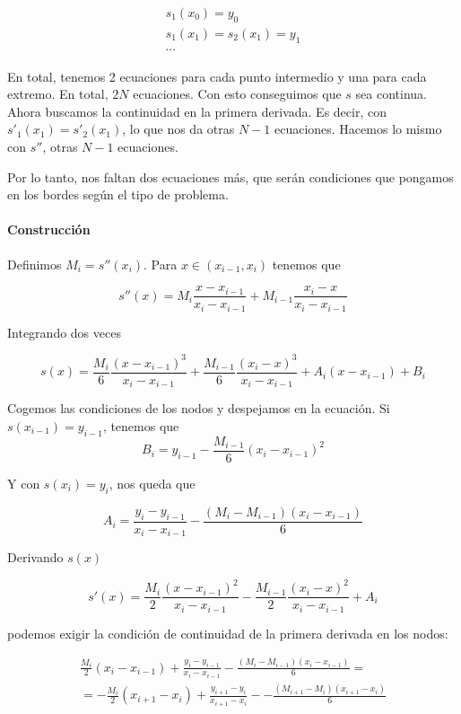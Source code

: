 \documentclass[nochap]{apuntes}
\begin{document}
\begin{gather*}
s_1(x_0) = y_0 \\
s_1(x_1) = s_2(x_1) = y_1 \\
\cdots
\end{gather*}

En total, tenemos 2 ecuaciones para cada punto intermedio y una para cada extremo. En total, $2N$ ecuaciones. Con esto conseguimos que $s$ sea continua. Ahora buscamos la continuidad en la primera derivada. Es decir, con $s'_1(x_1) = s'_2(x_1)$, lo que nos da otras $N-1$ ecuaciones. Hacemos lo mismo con $s''$, otras $N-1$ ecuaciones.

Por lo tanto, nos faltan dos ecuaciones más, que serán condiciones que pongamos en los bordes según el tipo de problema.

\paragraph{Construcción} 

Definimos $M_i=s''(x_i)$. Para $x\in (x_{i-1}, x_i)$ tenemos que

\[ s''(x) = M_i\frac{x-x_{i-1}}{x_i - x_{i-1}} + M_{i-1}\frac{x_i - x}{x_i - x_{i-1}}  \]

Integrando dos veces

\[ s(x) = \frac{M_i}{6}\frac{(x-x_{i-1})^3}{x_i - x_{i-1}} + \frac{M_{i-1}}{6}\frac{(x_i - x)^3}{x_i - x_{i-1}}  + A_i(x-x_{i-1}) + B_i \]

Cogemos las condiciones de los nodos y despejamos en la ecuación. Si $s(x_{i-1}) = y_{i-1}$, tenemos que 
\[ B_i = y_{i-1} - \frac{M_{i-1}}{6} (x_i-x_{i-1})^2 \]

Y con $s(x_i) = y_i$, nos queda que

\[ A_i = \frac{y_i-y_{i-1}}{x_i - x_{i-1}} - \frac{(M_i-M_{i-1})(x_i-x_{i-1})}{6} \]

Derivando $s(x)$

\[ s'(x) = \frac{M_i}{2}\frac{(x-x_{i-1})^2}{x_i - x_{i-1}} - \frac{M_{i-1}}{2}\frac{(x_i - x)^2}{x_i - x_{i-1}}  + A_i \]

podemos exigir la condición de continuidad de la primera derivada en los nodos:

\begin{gather*} \frac{M_i}{2}(x_i-x_{i-1})+\frac{y_i-y_{i-1}}{x_i - x_{i-1}} -\frac{(M_i-M_{i-1})(x_i-x_{i-1})}{6} =\\= -\frac{M_i}{2}(x_{i+1}-x_i) +\frac{y_{i+1}-y_{i}}{x_{i+1} - x_{i}} - -\frac{(M_{i+1}-M_{i})(x_{i+1}-x_{i})}{6} 
\end{gather*}
\end{document}

